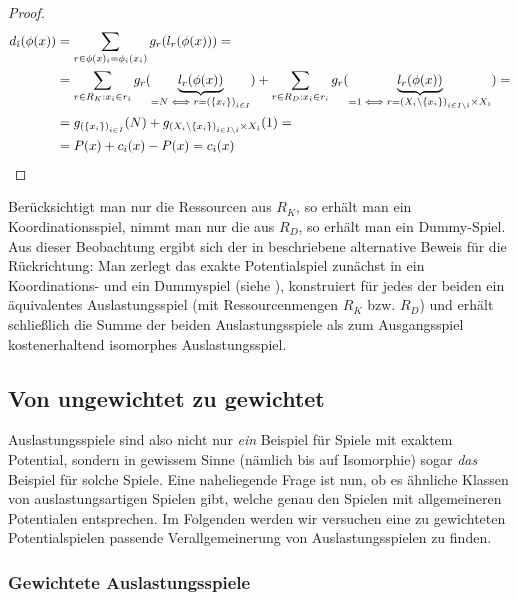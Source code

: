 \begin{proof}
	\begin{align*}
		d_{\hat{\imath}}(\phi(x)) 	&=\sum_{r \in \phi(x)_{\hat{\imath}} = \phi_{\hat{\imath}}(x_{\hat{\imath}})} g_r(l_r(\phi(x))) = \\
		&=\sum_{r \in R_K: x_{\hat{\imath}} \in r_{\hat{\imath}}} g_r(\underbrace{l_r(\phi(x))}_{= N \iff r = \left(\{x_i\}\right)_{i \in I}}) + \sum_{r \in R_D: x_{\hat{\imath}} \in r_i} g_r(\underbrace{l_r(\phi(x))}_{=1 \iff r = \left(X_i\setminus\{x_i\}\right)_{i \in I\setminus\hat{\imath}} \times X_{\hat{\imath}}}) = \\
		&=g_{\left(\{x_i\}\right)_{i \in I}}(N) + g_{\left(X_i\setminus\{x_i\}\right)_{i \in I\setminus\hat{\imath}} \times X_{\hat{\imath}}}(1) = \\
		&=P(x) + c_{\hat{\imath}}(x) - P(x) = c_{\hat{\imath}}(x) \qedhere									
		\end{align*}
\end{proof}

\begin{bem}
	Berücksichtigt man nur die Ressourcen aus $R_K$, so erhält man ein Koordinationsspiel, nimmt man nur die aus $R_D$, so erhält man ein Dummy-Spiel. Aus dieser Beobachtung ergibt sich der in \cite{KoordDummy} beschriebene alternative Beweis für die Rückrichtung: Man zerlegt das exakte Potentialspiel zunächst in ein Koordinations- und ein Dummyspiel (siehe ), konstruiert für jedes der beiden ein äquivalentes Auslastungsspiel (mit Ressourcenmengen $R_K$ bzw. $R_D$) und erhält schließlich die Summe der beiden Auslastungsspiele als zum Ausgangsspiel kostenerhaltend isomorphes Auslastungsspiel.
\end{bem}


\subsection{Von ungewichtet zu gewichtet}

Auslastungsspiele sind also nicht nur \emph{ein} Beispiel für Spiele mit exaktem Potential, sondern in gewissem Sinne (nämlich bis auf Isomorphie) sogar \emph{das} Beispiel für solche Spiele. Eine naheliegende Frage ist nun, ob es ähnliche Klassen von \glqq auslastungsartigen\grqq{} Spielen gibt, welche genau den Spielen mit allgemeineren Potentialen entsprechen. Im Folgenden werden wir versuchen eine zu gewichteten Potentialspielen passende Verallgemeinerung von Auslastungsspielen zu finden.

\subsubsection{Gewichtete Auslastungsspiele}

